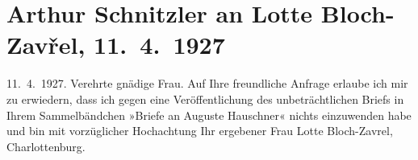 

         
         \renewcommand{\erwaehntePersonen}{Personen: Lotte Bloch-Zavřel}
         \renewcommand{\erwaehnteOrte}{Orte: Berlin, Charlottenburg, Wien}
         \renewcommand{\erwaehnteWerke}{Werke: Briefe an Auguste Hauschner}
               \section[Arthur Schnitzler an Lotte Bloch-Zavřel, 11. 4. 1927]{ Arthur Schnitzler an Lotte Bloch-Zavřel, 11. 4. 1927}\nopagebreak{}\rehead{ }\begin{ledgroupsized}[t]{13cm}\normalsize\beginnumbering \toendnotes[C]{\smallbreak\pagebreak[2]} 
\pstart
           \raggedleft{}{\pb}11. 4. 1927.\pend
           \pstart{}Verehrte gnädige Frau.\pend\pstart
           Auf Ihre freundliche Anfrage erlaube ich mir zu erwiedern, dass ich gegen eine
               Veröffentlichung des unbeträchtlichen Briefs in Ihrem Sammelbändchen »Briefe an Auguste Hauschner« nichts einzuwenden habe und bin
               mit vorzüglicher Hochachtung\pend
           \pstart Ihr ergebener\pend{}{\bigskip}\pstart
           \noindent{}Frau Lotte Bloch-Zavrel,\pend
           \pstart
           Charlottenburg.\pend
           
         
         \endnumbering{}\end{ledgroupsized}  \newcommand{\dateiname}{L02584}\newcommand{\titel}{Arthur Schnitzler an Lotte Bloch-Zavřel, 11. 4. 1927}\newcommand{\editorInnen}{Martin Anton Müller und Laura Untner}
      